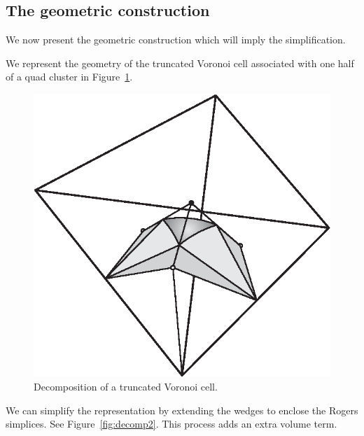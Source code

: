 \subsection{The geometric construction}
We now present the geometric construction which will imply the
simplification.

We represent the geometry of the truncated Voronoi cell associated with
one half of a quad cluster in Figure~\ref{fig:decomp1}.

\begin{figure}
\begin{center}
\includegraphics{PS/decomp1}
\end{center}
\caption{Decomposition of a truncated Voronoi cell.}
\label{fig:decomp1}
\end{figure}

We can simplify the representation by
extending the wedges to enclose the Rogers simplices.
See Figure~\ref{fig:decomp2}.
This process adds an extra volume term.

